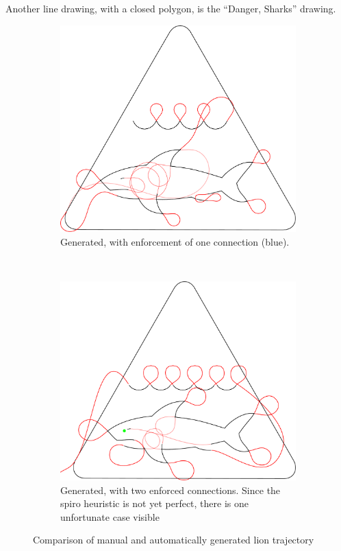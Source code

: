 Another line drawing, with a closed polygon, is the \enquote{Danger, Sharks} drawing.

\begin{figure}
\centering
\begin{subfigure}[t]{0.95\textwidth}
	\includegraphics[width=\textwidth]{images/results/shark/export_hai_new.pdf}
	\caption{Generated, with enforcement of one connection (blue).}
\end{subfigure}\\
\begin{subfigure}[t]{0.45\textwidth}
	\includegraphics[width=\textwidth]{images/results/shark/hai_achtung.pdf}
	\caption{Generated, with two enforced connections. Since the spiro heuristic is not yet perfect, there is one unfortunate case visible}
\end{subfigure}

\caption{Comparison of manual and automatically generated lion trajectory}
\end{figure}
